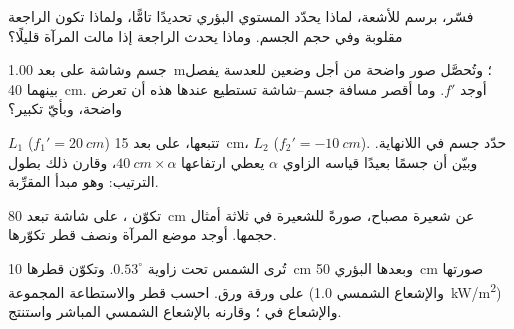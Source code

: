 \begin{exercise}[$\star\star$]\label{exo:b1:mirrors-thin-lenses:8}
فسّر، برسم للأشعة، لماذا يحدّد  المستوي البؤري
تحديدًا تامًّا، ولماذا تكون  الراجعة مقلوبة وفي حجم
الجسم. وماذا يحدث  الراجعة إذا مالت المرآة قليلًا؟
\end{exercise}

\begin{exercise}[$\star\star$]\label{exo:b1:mirrors-thin-lenses:9}
جسم وشاشة على بعد \qty{1.00}{m}؛ وتُحصَّل صور واضحة
من أجل وضعين للعدسة يفصل بينهما \qty{40}{cm}. أوجد $f'$. وما
أقصر مسافة جسم--شاشة تستطيع عندها هذه  أن تعرض
 واضحة، وبأيّ تكبير؟
\end{exercise}

\begin{exercise}[$\star\star\star$]\label{exo:b1:mirrors-thin-lenses:10}
 $L_1$ ($f_1' = \qty{20}{cm}$) تتبعها، على بعد \qty{15}{cm}،
 $L_2$ ($f_2' = \qty{-10}{cm}$). حدّد
 جسم في اللانهاية. وبيّن أن جسمًا بعيدًا قياسه الزاوي
$\alpha$ يعطي  ارتفاعها $\qty{40}{cm}\times\alpha$،
وقارن ذلك بطول الترتيب: وهو مبدأ  المقرِّبة.
\end{exercise}

\begin{exercise}[$\star\star\star$]\label{exo:b1:mirrors-thin-lenses:11}
تكوّن ، على شاشة تبعد \qty{80}{cm} عن شعيرة مصباح،
صورةً للشعيرة في ثلاثة أمثال حجمها. أوجد موضع
المرآة ونصف قطر تكوّرها.
\end{exercise}

\begin{exercise}[$\star\star\star$]\label{exo:b1:mirrors-thin-lenses:12}
تُرى الشمس تحت زاوية $0.53^\circ$. وتكوّن  قطرها
\qty{10}{cm} وبعدها البؤري \qty{50}{cm} صورتها على ورقة
ورق. احسب قطر  والاستطاعة المجموعة (والإشعاع
الشمسي \qty{1.0}{kW/m^2}) والإشعاع في ؛ وقارنه
بالإشعاع الشمسي المباشر واستنتج.
\end{exercise}

